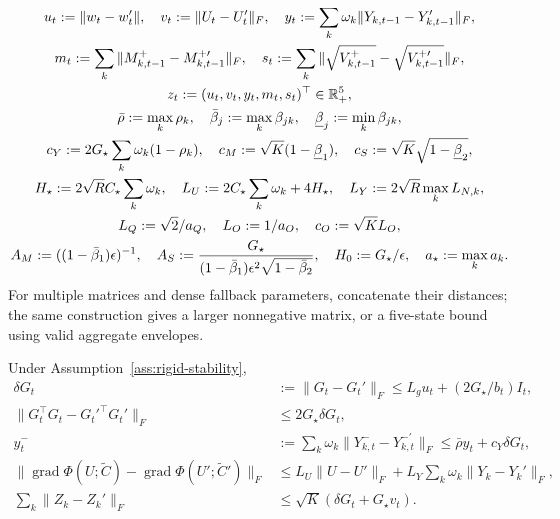 \begin{definition}
\begin{gather}
 u_t:=\|w_t-w_t'\|,\quad v_t:=\|U_t-U_t'\|_F,\quad
 y_t:=\sum_k\omega_k\|Y_{k,t-1}-Y_{k,t-1}'\|_F,\\
 m_t:=\sum_k\|M_{k,t-1}^+-M_{k,t-1}^{+\prime}\|_F,\quad
 s_t:=\sum_k\|\sqrt{V_{k,t-1}^+}-\sqrt{V_{k,t-1}^{+\prime}}\|_F,\\
 z_t:=(u_t,v_t,y_t,m_t,s_t)^\top\in\mathbb R_+^5,\\
 \bar\rho:=\max_k\rho_k,\quad
 \bar\beta_j:=\max_k\beta_{jk},\quad\underline\beta_j:=\min_k\beta_{jk},\\
 c_Y:=2G_\star\sum_k\omega_k(1-\rho_k),\quad
 c_M:=\sqrt K(1-\underline\beta_1),\quad
 c_S:=\sqrt K\sqrt{1-\underline\beta_2},\\
 H_\star:=2\sqrt R C_\star\sum_k\omega_k,\quad
 L_U:=2C_\star\sum_k\omega_k+4H_\star,\quad
 L_Y:=2\sqrt R\max_k L_{N,k},\\
 L_Q:=\sqrt2/a_Q,\quad L_O:=1/a_O,\quad c_O:=\sqrt K L_O,\\
 A_M:=((1-\bar\beta_1)\epsilon)^{-1},\quad
 A_S:=\frac{G_\star}{(1-\bar\beta_1)\epsilon^2\sqrt{1-\bar\beta_2}},\quad
 H_0:=G_\star/\epsilon,\quad a_\star:=\max_k a_k.
\end{gather}
For multiple matrices and dense fallback parameters, concatenate their distances;
the same construction gives a larger nonnegative matrix, or a five-state bound
using valid aggregate envelopes.
\end{definition}
\begin{lemma}
\label{lem:rigid-state-primitives}
Under Assumption~\ref{ass:rigid-stability},
\begin{align}
 \delta G_t&:=\|G_t-G_t'\|_F\le L_gu_t+(2G_\star/b_t)I_t,\\
 \|G_t^\top G_t-G_t'^\top G_t'\|_F&\le2G_\star\delta G_t,\\
 y_t^-&:=\sum_k\omega_k\|Y_{k,t}^--Y_{k,t}^{-\prime}\|_F
             \le\bar\rho y_t+c_Y\delta G_t,\\
 \|\operatorname{grad}\Phi(U;\widetilde C)
        -\operatorname{grad}\Phi(U';\widetilde C')\|_F
 &\le L_U\|U-U'\|_F+L_Y\sum_k\omega_k\|Y_k-Y_k'\|_F,\\
 \sum_k\|Z_k-Z_k'\|_F&\le\sqrt K(\delta G_t+G_\star v_t).
\end{align}
\end{lemma}
